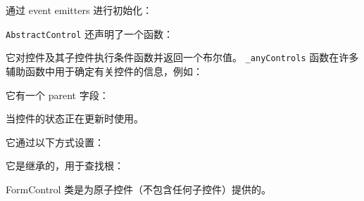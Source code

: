 


通过 event emitters 进行初始化：




\texttt{AbstractControl} 还声明了一个函数：




它对控件及其子控件执行条件函数并返回一个布尔值。
\texttt{\_anyControls} 函数在许多辅助函数中用于确定有关控件的信息，例如：




它有一个 parent 字段：




当控件的状态正在更新时使用。




它通过以下方式设置：




它是继承的，用于查找根：




FormControl 类是为原子控件（不包含任何子控件）提供的。




